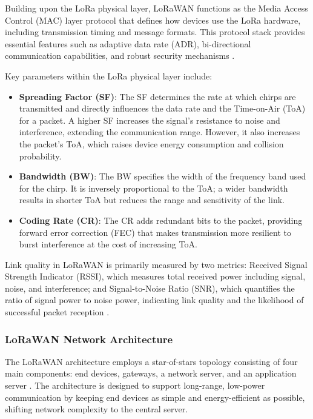 \documentclass[12pt,a4paper]{article}
\begin{document}
Building upon the LoRa physical layer, LoRaWAN functions as the Media Access Control (MAC) layer protocol that defines how devices use the LoRa hardware, including transmission timing and message formats. This protocol stack provides essential features such as adaptive data rate (ADR), bi-directional communication capabilities, and robust security mechanisms \cite{Farhad23-LoRaWAN-Meets-ML}.

Key parameters within the LoRa physical layer include:

\begin{itemize}
    \item \textbf{Spreading Factor (SF)}: The SF determines the rate at which chirps are transmitted and directly influences the data rate and the Time-on-Air (ToA) for a packet. A higher SF increases the signal's resistance to noise and interference, extending the communication range. However, it also increases the packet's ToA, which raises device energy consumption and collision probability.
    
    \item \textbf{Bandwidth (BW)}: The BW specifies the width of the frequency band used for the chirp. It is inversely proportional to the ToA; a wider bandwidth results in shorter ToA but reduces the range and sensitivity of the link.
    
    \item \textbf{Coding Rate (CR)}: The CR adds redundant bits to the packet, providing forward error correction (FEC) that makes transmission more resilient to burst interference at the cost of increasing ToA.
\end{itemize}

Link quality in LoRaWAN is primarily measured by two metrics: Received Signal Strength Indicator (RSSI), which measures total received power including signal, noise, and interference; and Signal-to-Noise Ratio (SNR), which quantifies the ratio of signal power to noise power, indicating link quality and the likelihood of successful packet reception \cite{GonzalezPalacio2024_ML_TransmissionPowerControl, Aarif2025rssi_prediction}.

\subsubsection{LoRaWAN Network Architecture}

The LoRaWAN architecture employs a star-of-stars topology consisting of four main components: end devices, gateways, a network server, and an application server \cite{Raza17, Augustin16}. The architecture is designed to support long-range, low-power communication by keeping end devices as simple and energy-efficient as possible, shifting network complexity to the central server.
\end{document}
